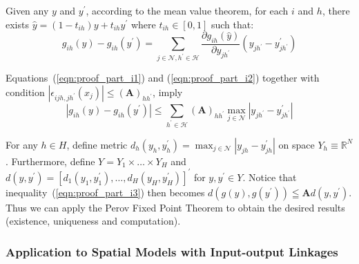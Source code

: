Given any $y$ and $y^{\prime}$, according to the mean value theorem, for each $i$ and $h$, 
there exists $\hat{y}=\left(1-t_{i h}\right) y+t_{i h} y^{\prime}$ where $t_{i h} \in[0,1]$ such that:
\begin{equation}
    \label{eqn:proof_part_i2}
    g_{i h}(y)-g_{i h}\left(y^{\prime}\right)=\sum_{j \in \mathcal{N}, h^{\prime} \in \mathcal{H}} \frac{\partial g_{i h}(\hat{y})}{\partial y_{j h^{\prime}}}\left(y_{j h^{\prime}}-y_{j h^{\prime}}^{\prime}\right)
\end{equation}


Equations~(\ref{eqn:proof_part_i1}) and (\ref{eqn:proof_part_i2}) together with 
condition $\left|\epsilon_{i j h, j h^{\prime}}\left(x_j\right)\right| \leq(\mathbf{A})_{h h^{\prime}}$, imply
\begin{equation}
    \label{eqn:proof_part_i3}
\left|g_{i h}(y)-g_{i h}\left(y^{\prime}\right)\right| \leq \sum_{h^{\prime} \in \mathcal{H}}(\mathbf{A})_{h h^{\prime}} \max _{j \in \mathcal{N}}\left|y_{j h^{\prime}}-y_{j h^{\prime}}^{\prime}\right|
\end{equation}

For any $h \in H$, define metric $d_h\left(y_h, y_h^{\prime}\right)=\max _{j \in \mathcal{N}}\left|y_{j h}-y_{j h}^{\prime}\right|$ on space $Y_h \equiv \mathbb{R}^N$. 
Furthermore, define $Y=Y_1 \times \ldots \times Y_H$ and $d\left(y, y^{\prime}\right)=\left[d_1\left(y_1, y_1^{\prime}\right), \ldots, d_H\left(y_H, y_H^{\prime}\right)\right]^{\prime}$ for $y, y^{\prime} \in Y$.
Notice that inequality~(\ref{eqn:proof_part_i3}) then becomes $d\left(g(y), g\left(y^{\prime}\right)\right) \leqq \mathbf{A} d\left(y, y^{\prime}\right)$. 
Thus we can apply the Perov Fixed Point Theorem to obtain the desired results 
(existence, uniqueness and computation).

\subsubsection{Application to Spatial Models with Input-output Linkages}